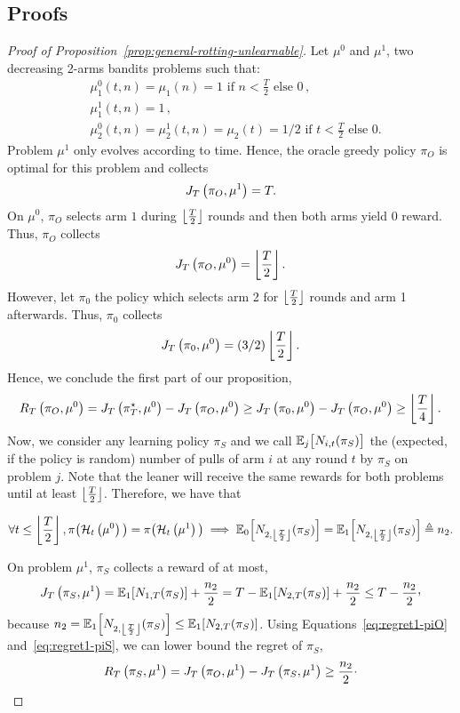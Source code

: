 \subsection{Proofs}
\label{ss:rested-restless-proofs}
\begin{proof}[Proof of Proposition~\ref{prop:general-rotting-unlearnable}]
Let $\mu^{0}$ and $\mu^{1}$, two decreasing 2-arms bandits problems such that:
\begin{align*}
 &\mu^{0}_1(t,n) = \mu_1(n) = 1 \text{ if } n<\frac{T}{2} \text{ else } 0\,,\\
 &\mu^{1}_1(t,n) = 1\,, \\
 &\mu^{0}_2(t,n) = \mu^{1}_2(t,n) = \mu_2(t) = 1/2 \text{ if } t<\frac{T}{2} \text{ else } 0.
\end{align*}
Problem $\mu^{1}$ only evolves according to time. Hence, the oracle greedy policy $\pi_O$ is optimal for this problem and collects
\begin{equation}
\label{eq:regret1-piO}
J_T\left(\pi_O, \mu^1\right) = T.
\end{equation}
On $\mu^{0}$, $\pi_O$ selects arm $1$ during $\left\lfloor\frac{T}{2}\right\rfloor$ rounds and then both arms yield $0$ reward. Thus, $\pi_O$ collects 
\[J_T\left(\pi_O, \mu^0\right) = \left\lfloor\frac{T}{2}\right\rfloor.\]
However, let $\pi_0$ the policy which selects arm 2 for $\left\lfloor\frac{T}{2}\right\rfloor$ rounds and arm 1 afterwards. Thus, $\pi_0$ collects
\begin{equation}
\label{eq:regret0-pi0}
  J_T\left(\pi_0, \mu^0\right) = \left(3/2\right) \left\lfloor\frac{T}{2}\right\rfloor.  
\end{equation}
Hence, we conclude the first part of our proposition, 
\[R_T\left(\pi_O, \mu^0\right) = J_T\left(\pi^\star_T, \mu^0\right) - J_T\left(\pi_O, \mu^0\right) \geq J_T\left(\pi_0, \mu^0\right) - J_T\left(\pi_O, \mu^0\right) \geq  \left\lfloor\frac{T}{4}\right\rfloor.\]
Now, we consider any learning policy $\pi_S$ and we call $\mathbb{E}_j\big[N_{i,t}(\pi_S)\big]$ the (expected, if the policy is random) number of pulls of arm $i$ at any round $t$ by $\pi_S$ on problem $j$. Note that the leaner will receive the same rewards for both problems until at least $\left\lfloor\frac{T}{2}\right\rfloor$. Therefore, we have that 

\[ \forall t \leq \left\lfloor\frac{T}{2}\right\rfloor, \pi\big(\mathcal{H}_t\left(\mu^0\right)\big) = \pi\big(\mathcal{H}_t\left(\mu^1\right)\big) \implies \mathbb{E}_0\Big[N_{2,\left\lfloor\frac{T}{2}\right\rfloor}(\pi_S)\Big] = \mathbb{E}_1\Big[N_{2,\left\lfloor\frac{T}{2}\right\rfloor}(\pi_S)\Big] \triangleq n_2.\]

On problem $\mu^{1}$, $\pi_S$ collects a reward of at most,
\begin{equation}
\label{eq:regret1-piS}
    J_T\pa{\pi_S, \mu^1} = \EEempty_1[N_{1,T}(\pi_S)] + \frac{n_2}{2} = T - \EEempty_1[N_{2,T}(\pi_S)] + \frac{n_2}{2} \leq T - \frac{n_2}{2}\CommaBin
\end{equation}
because $n_2 = \mathbb{E}_1\Big[N_{2,\left\lfloor\frac{T}{2}\right\rfloor}(\pi_S)\Big] \leq \mathbb{E}_1[N_{2,T}(\pi_S)]$. Using Equations~\ref{eq:regret1-piO} and~\ref{eq:regret1-piS}, we can lower bound the regret of $\pi_S$, 
\[ R_T\left(\pi_S, \mu^1\right) = J_T\left(\pi_O, \mu^1\right) - J_T\left(\pi_S, \mu^1\right) \geq  \frac{n_2}{2}\cdot \]



\end{proof}

